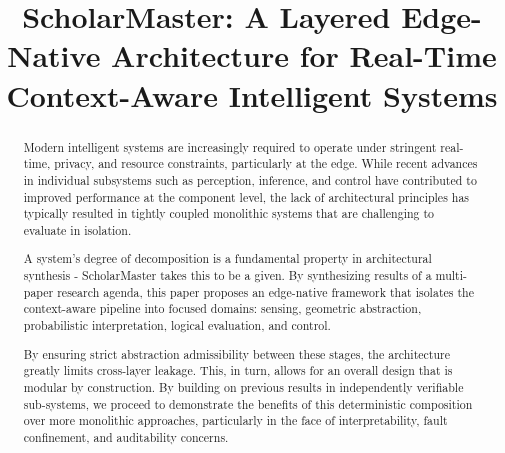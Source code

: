 \documentclass[conference]{IEEEtran}
\begin{document}
\title{ScholarMaster: A Layered Edge-Native Architecture for Real-Time Context-Aware Intelligent Systems}

\author{
}

\maketitle

\begin{abstract}
Modern intelligent systems are increasingly required to operate under stringent real-time, privacy, and resource constraints, particularly at the edge. While recent advances in individual subsystems such as perception, inference, and control have contributed to improved performance at the component level, the lack of architectural principles has typically resulted in tightly coupled monolithic systems that are challenging to evaluate in isolation. 

A system’s degree of decomposition is a fundamental property in architectural synthesis - ScholarMaster takes this to be a given. By synthesizing results of a multi-paper research agenda, this paper proposes an edge-native framework that isolates the context-aware pipeline into focused domains: sensing, geometric abstraction, probabilistic interpretation, logical evaluation, and control. 

By ensuring strict abstraction admissibility between these stages, the architecture greatly limits cross-layer leakage. This, in turn, allows for an overall design that is modular by construction. By building on previous results in independently verifiable sub-systems, we proceed to demonstrate the benefits of this deterministic composition over more monolithic approaches, particularly in the face of interpretability, fault confinement, and auditability concerns.
\end{abstract}
\end{document}

